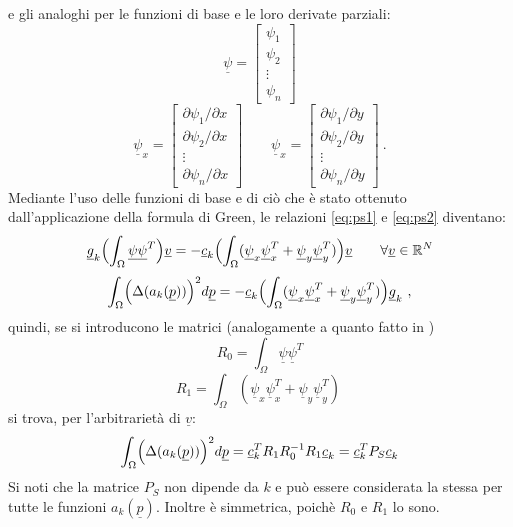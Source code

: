 \documentclass[a4paper,11pt,twoside,openright]{book}							%
\begin{document}
e gli analoghi per le funzioni di base e le loro derivate parziali:
$$
\underline \psi =
\begin{bmatrix}
\psi_{1}  \\
\psi_{2}  \\
\vdots\\
\psi_{n}
\end{bmatrix}
$$
\begin{equation}
\underline \psi_x=  \begin{bmatrix}
\partial \psi_{1}/\partial x \\
\partial \psi_{2}/\partial x  \\
\vdots\\
\partial \psi_{n}/\partial x \end{bmatrix} 
\qquad
\underline \psi_x=  \begin{bmatrix}
\partial \psi_{1}/\partial y  \\
\partial \psi_{2}/\partial y  \\
\vdots\\
\partial \psi_{n}/\partial y\end{bmatrix} \ .
\end{equation}
Mediante l'uso delle funzioni di base e di ciò che è stato ottenuto dall'applicazione della formula di Green, le relazioni \ref{eq:ps1} e \ref{eq:ps2} diventano:
$$
\underline{g}_k \Bigl(\int_\Omega \underline \psi \underline \psi^T \Bigr)\underline{v}=
-\underline{c}_k \Bigl(\int_\Omega (\underline \psi_x \underline \psi_x^T + \underline \psi_y \underline \psi_y^T)\Bigr) \underline{v} \qquad \forall \underline{v} \in \mathbb{R}^N
$$
$$
\int_{\Omega} \Bigl( \Delta(  a_k(\underline p)  ) \Bigr)^2 d \underline p = -\underline{c}_k \Bigl(\int_\Omega (\underline \psi_x \underline \psi_x^T + \underline \psi_y \underline \psi_y^T) \Bigr)\underline{g}_k \ ,
$$
quindi, se si introducono le matrici (analogamente a quanto fatto in \cite{art:sangalli})
$$ R_0 = \int_\Omega \underline \psi \underline \psi^T $$
$$ R_1 = \int_\Omega (\underline \psi_x \underline \psi_x^T + \underline \psi_y \underline \psi_y^T) \ $$
si trova, per l'arbitrarietà di $\underline v$:
\begin{equation}
\label{eq:pspace}
\int_{\Omega} \Bigl( \Delta(  a_k(\underline p)  ) \Bigr)^2 d \underline p = \underline{c}_k^T R_1 R_0^{-1} R_1 \underline{c}_k=\underline{c}_k^T P_S \underline{c}_k
\end{equation}
Si noti che la matrice $P_S$ non dipende da $k$ e può essere considerata la stessa per tutte le funzioni $a_k(\underline{p})$. Inoltre è simmetrica, poichè $R_0$ e $R_1$ lo sono.
\end{document}
